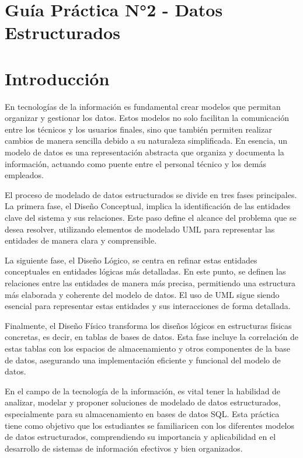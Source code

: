 \documentclass[12pt]{article}
\begin{document}
        

        \tableofcontents
        \newpage

        \section*{\centering Guía Práctica N°2 - Datos Estructurados}

        \section{Introducción}
                En tecnologías de la información es fundamental crear modelos que permitan organizar y gestionar los datos. Estos modelos no solo facilitan la comunicación entre los técnicos y los usuarios finales, sino que también permiten realizar cambios de manera sencilla debido a su naturaleza simplificada. En esencia, un modelo de datos es una representación abstracta que organiza y documenta la información, actuando como puente entre el personal técnico y los demás empleados.

                El proceso de modelado de datos estructurados se divide en tres fases principales. La primera fase, el Diseño Conceptual, implica la identificación de las entidades clave del sistema y sus relaciones. Este paso define el alcance del problema que se desea resolver, utilizando elementos de modelado UML para representar las entidades de manera clara y comprensible.

                La siguiente fase, el Diseño Lógico, se centra en refinar estas entidades conceptuales en entidades lógicas más detalladas. En este punto, se definen las relaciones entre las entidades de manera más precisa, permitiendo una estructura más elaborada y coherente del modelo de datos. El uso de UML sigue siendo esencial para representar estas entidades y sus interacciones de forma detallada.

                Finalmente, el Diseño Físico transforma los diseños lógicos en estructuras físicas concretas, es decir, en tablas de bases de datos. Esta fase incluye la correlación de estas tablas con los espacios de almacenamiento y otros componentes de la base de datos, asegurando una implementación eficiente y funcional del modelo de datos.

                En el campo de la tecnología de la información, es vital tener la habilidad de analizar, modelar y proponer soluciones de modelado de datos estructurados, especialmente para su almacenamiento en bases de datos SQL. Esta práctica tiene como objetivo que los estudiantes se familiaricen con los diferentes modelos de datos estructurados, comprendiendo su importancia y aplicabilidad en el desarrollo de sistemas de información efectivos y bien organizados.
        
\end{document}
